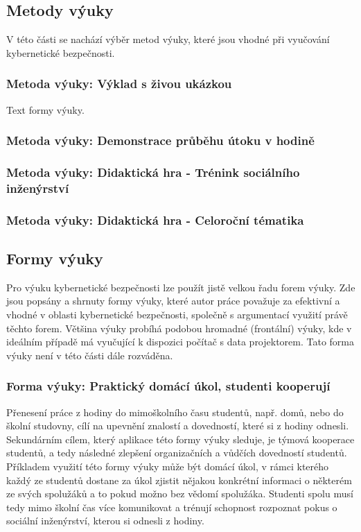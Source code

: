 \documentclass[a4paper, 12pt]{article}
\begin{document}
\subsection{Metody výuky}
V této části se nachází výběr metod výuky, které jsou vhodné při vyučování kybernetické bezpečnosti.

\subsubsection{Metoda výuky: Výklad s živou ukázkou}
Text formy výuky.

\subsubsection{Metoda výuky: Demonstrace průběhu útoku v hodině}

\subsubsection{Metoda výuky: Didaktická hra - Trénink sociálního inženýrství}

\subsubsection{Metoda výuky: Didaktická hra - Celoroční tématika}

\subsection{Formy výuky}
Pro výuku kybernetické bezpečnosti lze použít jistě velkou řadu forem výuky. Zde jsou popsány a shrnuty formy výuky, které autor práce považuje za efektivní a vhodné v oblasti kybernetické bezpečnosti, společně s argumentací využití právě těchto forem. Většina výuky probíhá podobou hromadné (frontální) výuky, kde v ideálním případě má vyučující k dispozici počítač s data projektorem. Tato forma výuky není v této části dále rozváděna.

\subsubsection{Forma výuky: Praktický domácí úkol, studenti kooperují}
Přenesení práce z hodiny do mimoškolního času studentů, např. domů, nebo do školní studovny, cílí na upevnění znalostí a dovedností, které si z hodiny odnesli. Sekundárním cílem, který aplikace této formy výuky sleduje, je týmová kooperace studentů, a tedy následné zlepšení organizačních a vůdčích dovedností studentů. Příkladem využití této formy výuky může být domácí úkol, v rámci kterého každý ze studentů dostane za úkol zjistit nějakou konkrétní informaci o některém ze svých spolužáků a to pokud možno bez vědomí spolužáka. Studenti spolu musí tedy mimo školní čas více komunikovat a trénují schopnost rozpoznat pokus o sociální inženýrství, kterou si odnesli z hodiny.
\end{document}
